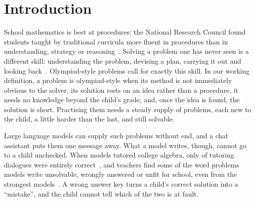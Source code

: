 \section{Introduction}
\label{sec:introduction}

School mathematics is best at procedures: the National Research Council found students taught by traditional curricula more fluent in procedures than in understanding, strategy or reasoning~\cite{anonymous2001adding}. Solving a problem one has never seen is a different skill: understanding the problem, devising a plan, carrying it out and looking back~\cite{polya2014solve}. Olympiad-style problems call for exactly this skill. In our working definition, a problem is olympiad-style when its method is not immediately obvious to the solver, its solution rests on an idea rather than a procedure, it needs no knowledge beyond the child's grade, and, once the idea is found, the solution is short. Practising them needs a steady supply of problems, each new to the child, a little harder than the last, and still solvable.

Large language models can supply such problems without end, and a chat assistant puts them one message away. What a model writes, though, cannot go to a child unchecked. When models tutored college algebra, only \pct{} of  tutoring dialogues were entirely correct~\cite{gupta2025beyond}, and teachers find some of the word problems models write unsolvable, wrongly answered or unfit for school, even from the strongest models~\cite{christ2024mathwell,christ2026edumath}. A wrong answer key turns a child's correct solution into a ``mistake'', and the child cannot tell which of the two is at fault.

